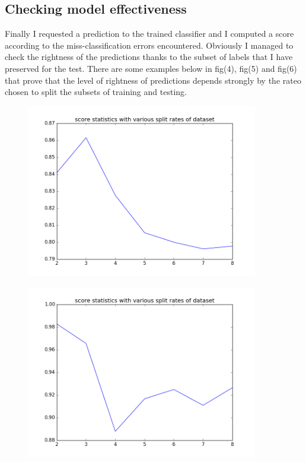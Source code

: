 \documentclass{article}
\begin{document}
				\subsection{Checking model effectiveness}
				Finally I requested a prediction to the trained classifier and I computed a score according to the miss-classification errors encountered.
				Obviously I managed to check the rightness of the predictions thanks to the subset of labels that I have preserved for the test.
				There are some examples below in fig(4), fig(5) and fig(6) that prove that the level of rightness of predictions depends strongly by the rateo chosen to split the subsets of training and testing.
									\begin{center}
\begin{figure}
\centering
\includegraphics[width=0.9\textwidth]{score-statistics}
\caption{}
\label{fig:4}
\end{figure}
\begin{figure}
\centering
\includegraphics[width=0.9\textwidth]{score-datasplit}

\end{figure}
\end{center}
\end{document}

